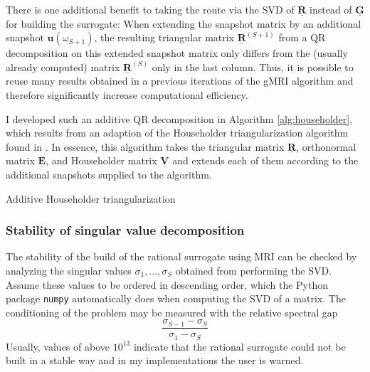 \documentclass[11pt, a4paper]{article}
\begin{document}
There is one additional benefit to taking the route via the \acrshort{SVD} of
$\mathbf{\underline{R}}$ instead of $\mathbf{\underline{G}}$
for building the surrogate: When extending the snapshot matrix by an additional
snapshot $\mathbf{u}(\omega_{S+1})$, the resulting triangular matrix $\mathbf{\underline{R}}^{(S+1)}$
from a QR decomposition on this extended snapshot matrix only differs from the 
(usually already computed) matrix $\mathbf{\underline{R}}^{(S)}$ only in the last column.
Thus, it is possible to reuse many results obtained in a previous iterations of
the \acrshort{gMRI} algorithm and therefore significantly increase computational
efficiency.

I developed such an additive QR decomposition in Algorithm \ref{alg:householder},
which results from an adaption of the Householder triangularization algorithm
found in \citep{householder}. In essence, this algorithm takes the triangular
matrix $\mathbf{\underline{R}}$, orthonormal matrix $\mathbf{\underline{E}}$,
and Householder matrix $\mathbf{\underline{V}}$ and extends each of them according
to the additional snapshots supplied to the algorithm.

\begin{algorithm}
    \caption{Additive Householder triangularization} \label{alg:householder}
    
\end{algorithm}


\subsubsection{Stability of singular value decomposition}
\label{subsubsec:svd}
The stability of the build of the rational surrogate using \acrshort{MRI}
can be checked by analyzing the singular values $\sigma_1, \dots, \sigma_S$ 
obtained from performing the \acrshort{SVD}. Assume these values to be
ordered in descending order, which the Python package
\texttt{numpy} automatically does when computing the \acrshort{SVD} of a matrix. 
The conditioning of the problem may be measured with the relative
spectral gap \cite{davidePHD}
\begin{equation}
    \frac{\sigma_{S-1} - \sigma_S}{\sigma_1 - \sigma_S} \label{equ:spectral-gap}
\end{equation}
Usually, values of above $10^{13}$ indicate that the rational surrogate could not
be built in a stable way and in my implementations the user is warned.
\end{document}
